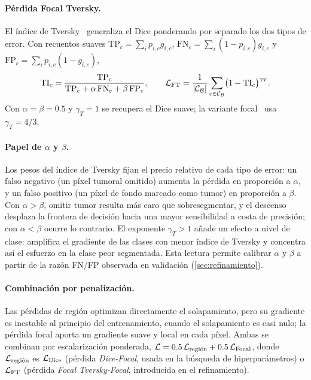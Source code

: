 \paragraph{Pérdida Focal Tversky.} El índice de Tversky~\cite{salehi2017tversky} generaliza el Dice ponderando por separado los dos tipos de error. Con recuentos suaves $\mathrm{TP}_c=\sum_i p_{i,c}g_{i,c}$, $\mathrm{FN}_c=\sum_i(1-p_{i,c})g_{i,c}$ y $\mathrm{FP}_c=\sum_i p_{i,c}(1-g_{i,c})$,
\begin{equation}\label{eq:tversky}
  \mathrm{TI}_c = \frac{\mathrm{TP}_c}{\mathrm{TP}_c + \alpha\,\mathrm{FN}_c + \beta\,\mathrm{FP}_c},
  \qquad
  \mathcal{L}_{\mathrm{FT}} = \frac{1}{|\mathcal{C}_{\mathcal{B}}|}\sum_{c\in\mathcal{C}_{\mathcal{B}}} \bigl(1-\mathrm{TI}_c\bigr)^{\gamma_{T}}.
\end{equation}
Con $\alpha=\beta=0.5$ y $\gamma_T=1$ se recupera el Dice suave; la variante focal~\cite{abraham2019focaltversky} usa $\gamma_T=4/3$.

\paragraph{Papel de $\alpha$ y $\beta$.} Los pesos del índice de Tversky fijan el precio relativo de cada tipo de error: un falso negativo (un píxel tumoral omitido) aumenta la pérdida en proporción a $\alpha$, y un falso positivo (un píxel de fondo marcado como tumor) en proporción a $\beta$. Con $\alpha>\beta$, omitir tumor resulta más caro que sobresegmentar, y el descenso desplaza la frontera de decisión hacia una mayor sensibilidad a costa de precisión; con $\alpha<\beta$ ocurre lo contrario. El exponente $\gamma_T>1$ añade un efecto a nivel de clase: amplifica el gradiente de las clases con menor índice de Tversky y concentra así el esfuerzo en la clase peor segmentada. Esta lectura permite calibrar $\alpha$ y $\beta$ a partir de la razón FN/FP observada en validación (\cref{sec:refinamiento}).

\paragraph{Combinación por penalización.} Las pérdidas de región optimizan directamente el solapamiento, pero su gradiente es inestable al principio del entrenamiento, cuando el solapamiento es casi nulo; la pérdida focal aporta un gradiente suave y local en cada píxel. Ambas se combinan por escalarización ponderada, $\mathcal{L} = 0.5\,\mathcal{L}_{\text{región}} + 0.5\,\mathcal{L}_{\mathrm{Focal}}$, donde $\mathcal{L}_{\text{región}}$ es $\mathcal{L}_{\mathrm{Dice}}$ (pérdida \emph{Dice-Focal}, usada en la búsqueda de hiperparámetros) o $\mathcal{L}_{\mathrm{FT}}$ (pérdida \emph{Focal Tversky-Focal}, introducida en el refinamiento).

